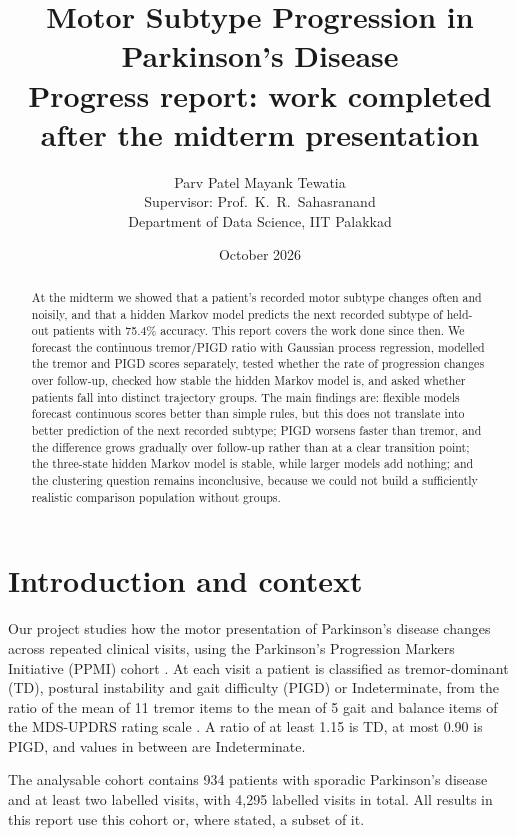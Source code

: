 \documentclass[11pt,a4paper]{article}
\title{\textbf{Motor Subtype Progression in Parkinson's Disease}\\[0.6em]
       \large Progress report: work completed after the midterm presentation}
\author{Parv Patel \quad\textbullet\quad Mayank Tewatia\\[0.4em]
        \small Supervisor: Prof.\ K.~R.\ Sahasranand\\
        \small Department of Data Science, IIT Palakkad}
\date{October 2026}
\begin{document}
\maketitle

\begin{abstract}
\noindent
At the midterm we showed that a patient's recorded motor subtype changes often
and noisily, and that a hidden Markov model predicts the next recorded subtype
of held-out patients with 75.4\% accuracy. This report covers the work done
since then. We forecast the continuous tremor/PIGD ratio with Gaussian process
regression, modelled the tremor and PIGD scores separately, tested whether the
rate of progression changes over follow-up, checked how stable the hidden
Markov model is, and asked whether patients fall into distinct trajectory
groups. The main findings are: flexible models forecast continuous scores
better than simple rules, but this does not translate into better prediction
of the next recorded subtype; PIGD worsens faster than tremor, and the
difference grows gradually over follow-up rather than at a clear transition
point; the three-state hidden Markov model is stable, while larger models add
nothing; and the clustering question remains inconclusive, because we could not
build a sufficiently realistic comparison population without groups.
\end{abstract}

\section{Introduction and context}

Our project studies how the motor presentation of Parkinson's disease changes
across repeated clinical visits, using the Parkinson's Progression Markers
Initiative (PPMI) cohort \cite{ppmi}. At each visit a patient is classified as
tremor-dominant (TD), postural instability and gait difficulty (PIGD) or
Indeterminate, from the ratio of the mean of 11 tremor items to the mean of 5
gait and balance items of the MDS-UPDRS rating scale \cite{stebbins,goetz}.
A ratio of at least 1.15 is TD, at most 0.90 is PIGD, and values in between
are Indeterminate.

The analysable cohort contains 934 patients with sporadic Parkinson's disease
and at least two labelled visits, with 4,295 labelled visits in total. All
results in this report use this cohort or, where stated, a subset of it.
\end{document}
